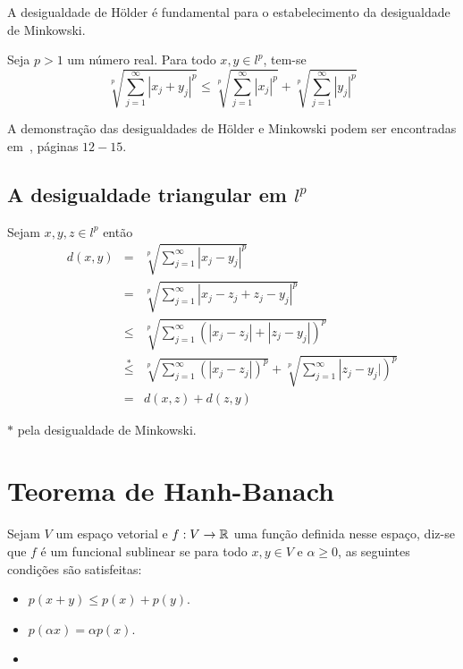 \documentclass[glenn,refnum,codigo]{Estilo}
\begin{document}
A desigualdade de H\"{o}lder é fundamental para o estabelecimento da
desigualdade de Minkowski.

\begin{teorema}
	Seja $p>1$ um número real. Para todo $x,y\in l^p$, tem-se
	\[
	\sqrt[p]{\sum_{j=1}^{\infty}|x_j+y_j|^p} \leqslant \sqrt[p]{\sum_{j=1}^{\infty}|x_j|^p} +
	\sqrt[p]{\sum_{j=1}^{\infty}|y_j|^p}
	\]
\end{teorema}

\begin{prova}
	A demonstração das desigualdades de H\"{o}lder e Minkowski podem ser
	encontradas em~\cite{kreyszig}, páginas $12-15$.
\end{prova}


\subsection{A desigualdade triangular em \texorpdfstring{$l^p$}{}}
Sejam $x,y,z\in l^p$ então
\begin{eqnarray*}
	d(x,y)&=&\sqrt[p]{\sum_{j=1}^{\infty}|x_j-y_j|^p}\\
	      &=&\sqrt[p]{\sum_{j=1}^{\infty}|x_j-z_j+z_j-y_j|^p}\\
	      &\leqslant&\sqrt[p]{\sum_{j=1}^{\infty}
	       \left(|x_j-z_j|+|z_j-y_j|\right)^p}\\
	      &\stackrel{*}{\leqslant}&\sqrt[p]{\sum_{j=1}^{\infty}
	       \left(|x_j-z_j|\right)^p}+\sqrt[p]{\sum_{j=1}^{\infty}
	       \left|z_j-y_j|\right)^p}\\
	      &=& d(x,z) + d(z,y)
\end{eqnarray*}

$*$ pela desigualdade de Minkowski.

\section{Teorema de Hanh-Banach}

\begin{define}
	Sejam $V$ um espaço vetorial e $f: V \rightarrow \mathbb{R}$ uma função definida nesse espaço,
	diz-se que $f$ é um funcional sublinear se para todo $x, y \in V$ e $\alpha \geqslant 0$,
	as seguintes condições são satisfeitas:
	\begin{itemize}
		\item $p(x + y) \leqslant p(x) + p(y)$.
		\item $p(\alpha x) = \alpha p(x)$.
		\item[]
	\end{itemize}
\end{define}
\end{document}
